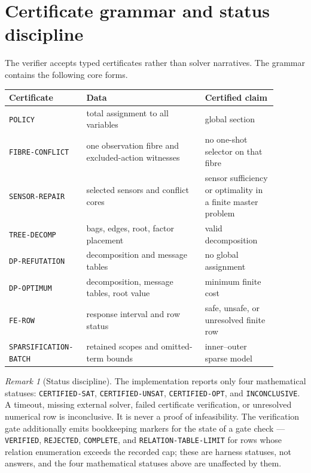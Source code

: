 \documentclass[11pt]{article}
\theoremstyle{plain}
\theoremstyle{definition}
\theoremstyle{remark}
\newtheorem{remark}[theorem]{Remark}
\begin{document}
\section{Certificate grammar and status discipline}
\label{sec:certificates}

The verifier accepts typed certificates rather than solver narratives.  The
grammar contains the following core forms.

\begin{center}
\begin{tabular}{@{}p{0.23\linewidth}p{0.41\linewidth}p{0.25\linewidth}@{}}
\toprule
Certificate & Data & Certified claim\\
\midrule
\texttt{POLICY} & total assignment to all variables & global section\\
\texttt{FIBRE-CONFLICT} & one observation fibre and excluded-action witnesses & no one-shot selector on that fibre\\
\texttt{SENSOR-REPAIR} & selected sensors and conflict cores & sensor sufficiency or optimality in a finite master problem\\
\texttt{TREE-DECOMP} & bags, edges, root, factor placement & valid decomposition\\
\texttt{DP-REFUTATION} & decomposition and message tables & no global assignment\\
\texttt{DP-OPTIMUM} & decomposition, message tables, root value & minimum finite cost\\
\texttt{FE-ROW} & response interval and row status & safe, unsafe, or unresolved finite row\\
\texttt{SPARSIFICATION-BATCH} & retained scopes and omitted-term bounds & inner--outer sparse model\\
\bottomrule
\end{tabular}
\end{center}

\begin{remark}[Status discipline]
\label{rem:status-discipline}
The implementation reports only four mathematical statuses:
\texttt{CERTIFIED-SAT}, \texttt{CERTIFIED-UNSAT}, \texttt{CERTIFIED-OPT}, and
\texttt{INCONCLUSIVE}.  A timeout, missing external solver, failed certificate
verification, or unresolved numerical row is inconclusive.  It is never a proof
of infeasibility.  The verification gate additionally emits bookkeeping
markers for the state of a gate check --- \texttt{VERIFIED},
\texttt{REJECTED}, \texttt{COMPLETE}, and \texttt{RELATION-TABLE-LIMIT} for
rows whose relation enumeration exceeds the recorded cap; these are harness
statuses, not answers, and the four mathematical statuses above are unaffected
by them.
\end{remark}
\end{document}
